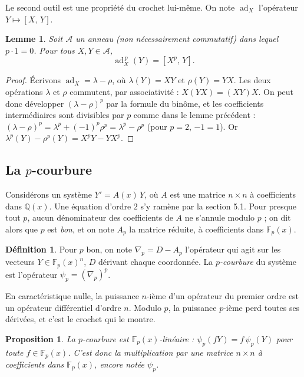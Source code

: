 \documentclass[11pt,a4paper]{article}
\theoremstyle{plain}
\newtheorem{proposition}[theoreme]{Proposition}
\newtheorem{lemme}[theoreme]{Lemme}
\theoremstyle{definition}
\newtheorem{definition}[theoreme]{Définition}
\theoremstyle{remark}
\newcommand{\Q}{\mathbb{Q}}
\newcommand{\F}{\mathbb{F}}
\DeclareMathOperator{\ad}{ad}
\newcommand{\Dx}{D}
\newcommand{\cro}[2]{\left[#1,\,#2\right]}
\begin{document}
Le second outil est une propriété du crochet lui-même. On note $\ad_X$ l'opérateur $Y \mapsto \cro XY$.

\begin{lemme}\label{lem:adp}
Soit $\mathcal A$ un anneau (non nécessairement commutatif) dans lequel $p \cdot 1 = 0$. Pour tous $X, Y \in \mathcal A$,
\[
  \ad_X^{\,p}(Y) = \cro{X^p}{Y} .
\]
\end{lemme}

\begin{proof}
Écrivons $\ad_X = \lambda - \rho$, où $\lambda(Y) = XY$ et $\rho(Y) = YX$. Les deux opérations $\lambda$ et $\rho$ commutent, par associativité : $X(YX) = (XY)X$. On peut donc développer $(\lambda - \rho)^p$ par la formule du binôme, et les coefficients intermédiaires sont divisibles par $p$ comme dans le lemme précédent : $(\lambda-\rho)^p = \lambda^p + (-1)^p\rho^p = \lambda^p - \rho^p$ (pour $p = 2$, $-1 = 1$). Or $\lambda^p(Y) - \rho^p(Y) = X^pY - YX^p$.
\end{proof}

\subsection{La \texorpdfstring{$p$}{p}-courbure}

Considérons un système $Y' = A(x)\,Y$, où $A$ est une matrice $n \times n$ à coefficients dans $\Q(x)$. Une équation d'ordre $2$ s'y ramène par la section 5.1. Pour presque tout $p$, aucun dénominateur des coefficients de $A$ ne s'annule modulo $p$ ; on dit alors que $p$ est \emph{bon}, et on note $A_p$ la matrice réduite, à coefficients dans $\F_p(x)$.

\begin{definition}
Pour $p$ bon, on note $\nabla_p = \Dx - A_p$ l'opérateur qui agit sur les vecteurs $Y \in \F_p(x)^n$, $\Dx$ dérivant chaque coordonnée. La \emph{$p$-courbure} du système est l'opérateur $\psi_p = (\nabla_p)^p$.
\end{definition}

En caractéristique nulle, la puissance $n$-ième d'un opérateur du premier ordre est un opérateur différentiel d'ordre $n$. Modulo $p$, la puissance $p$-ième perd toutes ses dérivées, et c'est le crochet qui le montre.

\begin{proposition}\label{prop:psilin}
La $p$-courbure est $\F_p(x)$-linéaire : $\psi_p(fY) = f\,\psi_p(Y)$ pour toute $f \in \F_p(x)$. C'est donc la multiplication par une matrice $n \times n$ à coefficients dans $\F_p(x)$, encore notée $\psi_p$.
\end{proposition}
\end{document}
